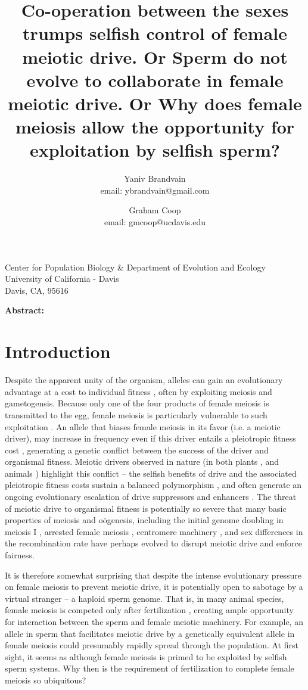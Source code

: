 \documentclass[12pt,letterpaper]{article}
\title{Co-operation between the sexes trumps selfish control of female
  meiotic drive. Or 
Sperm do not evolve to collaborate in female meiotic drive. Or Why does female meiosis allow the opportunity for exploitation by selfish sperm? }
\author{Yaniv Brandvain \\ email: ybrandvain@gmail.com  \and Graham Coop \\ email: gmcoop@ucdavis.edu }
\date{}
\begin{document}
\maketitle
\begin{center}
Center for Population Biology \& Department of Evolution and Ecology \\ University of California - Davis \\ Davis, CA, 95616
\end{center}

{\bf Abstract:}
\newpage

\section*{Introduction}

Despite the apparent unity of the organism, alleles can
gain an evolutionary advantage at a cost to  individual fitness
\citep{Burt2006}, often by exploiting meiosis and gametogensis.
Because only one of the four products of female meiosis is transmitted to the egg, female meiosis is particularly vulnerable to such exploitation \citep{Sandler1957,Pardo-ManuelDeVillena2001a}. 
An allele that biases female meiosis in its favor (i.e. a meiotic driver), may increase in frequency even if this driver entails a pleiotropic fitness cost \citep{Prout1973}, generating a genetic conflict between the success of the driver and organismal fitness.
Meiotic drivers observed in nature (in both plants
\citep{Buckler1999,Fishman2005,Fishman2008}, and animals
\citep{Agulnik1990,Wu2005,Pardo-ManuelDeVillena2001c}) highlight this
conflict -- the selfish benefits of drive and the associated
pleiotropic fitness costs sustain a balanced polymorphism
\citep{Prout1973}, 
and often generate an ongoing evolutionary escalation of drive suppressors and enhancers \citep{Dawe1996,Fishman2008}. 
The threat of meiotic drive to organismal fitness is potentially so
severe that many basic properties of
meiosis and o\"{o}genesis, including the initial genome doubling in
meiosis I \citep{Haig1991}, arrested female meiosis
\citep{Mira1998}, centromere machinery \citep{MalikHenikoff}, and sex differences in the recombination rate \citep{Haig2010,Brandvain2012} 
have perhaps evolved to disrupt meiotic drive and enforce fairness. 

It is therefore somewhat surprising that despite the intense evolutionary pressure on female meiosis to prevent meiotic drive, 
it is potentially open to sabotage by a virtual stranger -- a haploid sperm genome.
That is, in many animal species, female meiosis is competed only after fertilization \citep{Masui_book}, 
creating ample opportunity for interaction between the sperm and female meiotic machinery. 
For example, an allele in sperm that facilitates meiotic drive by a genetically equivalent allele in female meiosis %
     could presumably rapidly spread through the population.
At first sight, it seems as although female meiosis is primed to be exploited by selfish sperm systems.  
Why then is the requirement of fertilization to complete female meiosis so ubiquitous? 
\end{document}
